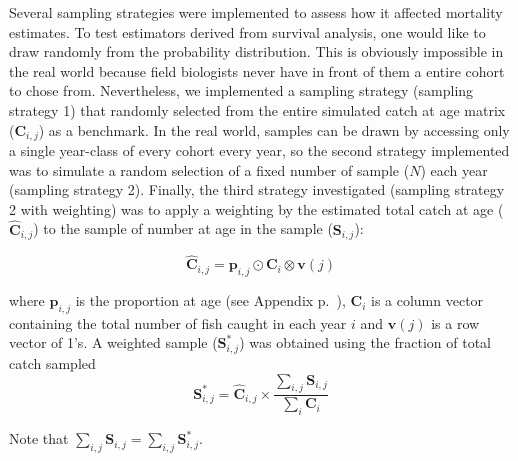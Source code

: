 \documentclass[12pt]{article}
\begin{document}
Several sampling strategies were implemented to assess how it affected mortality estimates. To test estimators derived from survival analysis, one would like to draw randomly from the probability distribution. This is obviously impossible in the real world because field biologists never have in front of them a entire cohort to chose from. Nevertheless, we implemented a sampling strategy (sampling strategy 1) that randomly selected from the entire simulated catch at age matrix ($\bm{C}_{i,j}$) as a benchmark. In the real world, samples can be drawn by accessing only a single year-class of every cohort every year, so the second strategy implemented was to simulate a random selection of a fixed number of sample ($N$) each year (sampling strategy 2). Finally, the third strategy investigated (sampling strategy 2 with weighting) was to apply a weighting by the estimated total catch at age ($\hat{\bm{C}}_{i,j}$) to the sample of number at age in the sample ($\bm{S}_{i,j}$):

\begin{equation}
\hat{\bm{C}}_{i,j} = \bm{p}_{i,j} \odot \bm{C}_{i} \otimes \bm{v}(j)
\end{equation}

\noindent where $\bm{p}_{i,j}$ is the proportion at age (see Appendix p.~\pageref{Appendix:DefinitionsOfMathematicalSymbols}), $\bm{C}_{i}$ is a column vector containing the total number of fish caught in each year $i$ and $\bm{v}(j)$ is a row vector of 1's. A weighted sample ($\bm{S}^{*}_{i,j}$) was obtained using the fraction of total catch sampled
\begin{equation}
\bm{S}^{*}_{i,j} = \hat{\bm{C}}_{i,j} \times \frac{\sum_{i,j} \bm{S}_{i,j}}{\sum_{i} \bm{C}_{i}}
\end{equation}

Note that $\sum_{i,j} \bm{S}_{i,j} = \sum_{i,j} \bm{S}^{*}_{i,j}$.\\

\end{document}
